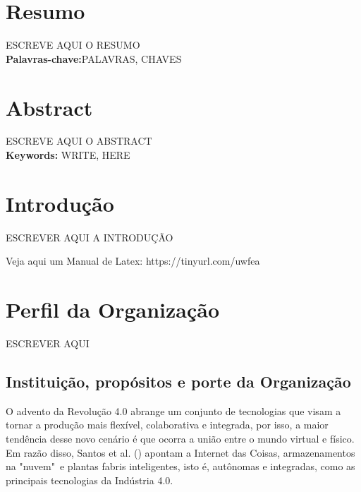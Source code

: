 \documentclass[a4paper]{article}
\begin{document}
\section*{\centering Resumo}
\vspace{10mm} %
\thispagestyle{empty}
\noindent
ESCREVE AQUI O RESUMO
\noindent
\\
\textbf{Palavras-chave:}PALAVRAS, CHAVES 
\\


\section*{\centering Abstract}
\vspace{4mm} %
\thispagestyle{empty}
\noindent
ESCREVE AQUI O ABSTRACT
\noindent
\\
\textbf{Keywords:} WRITE, HERE 



\clearpage

\begin{center}

\pagestyle{empty}%
\tableofcontents
\clearpage
\pagestyle{plain}%
\newpage
\end{center}

\setcounter{page}{6}%
\section{Introdução}

ESCREVER AQUI A INTRODUÇÃO

Veja aqui um Manual de Latex: https://tinyurl.com/uwfea


\newpage
\section{Perfil da Organização}

ESCREVER AQUI

\subsection{Instituição, propósitos e porte da Organização}

O advento da Revolução 4.0 abrange um conjunto de tecnologias que visam a tornar a produção mais flexível, colaborativa e integrada, por isso, a maior tendência desse novo cenário é que ocorra a união entre o mundo virtual e físico. Em razão disso, Santos et al. (\citeyear{santos}) apontam a Internet das Coisas, armazenamentos na "nuvem"\ e plantas fabris inteligentes, isto é, autônomas e integradas, como as principais tecnologias da Indústria 4.0. %
\end{document}
